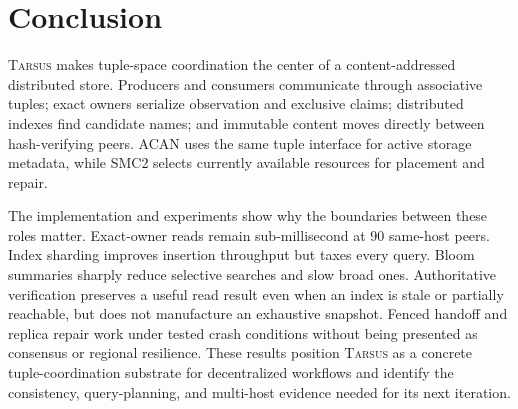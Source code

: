 \documentclass[conference]{IEEEtran}
\newcommand{\system}{\textsc{Tarsus}\xspace}
\begin{document}
\section{Conclusion}

\system makes tuple-space coordination the center of a content-addressed
distributed store. Producers and consumers communicate through associative
tuples; exact owners serialize observation and exclusive claims; distributed
indexes find candidate names; and immutable content moves directly between
hash-verifying peers. ACAN uses the same tuple interface for active storage
metadata, while SMC2 selects currently available resources for placement and
repair.

The implementation and experiments show why the boundaries between these
roles matter. Exact-owner reads remain sub-millisecond at 90 same-host peers.
Index sharding improves insertion throughput but taxes every query. Bloom
summaries sharply reduce selective searches and slow broad ones. Authoritative
verification preserves a useful read result even when an index is stale or
partially reachable, but does not manufacture an exhaustive snapshot. Fenced
handoff and replica repair work under tested crash conditions without being
presented as consensus or regional resilience. These results position \system
as a concrete tuple-coordination substrate for decentralized workflows and
identify the consistency, query-planning, and multi-host evidence needed for
its next iteration.
\end{document}
